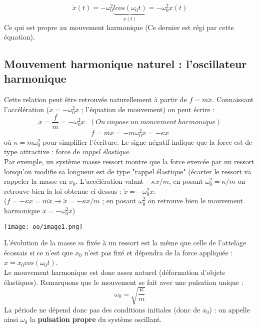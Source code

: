 \documentclass[british,french,11pt, a4paper, openany]{book}
\begin{document}
	
	
	\begin{equation}
		\ddot{x}(t) = -\omega_0^2 \underbrace{l cos(\omega_0 t)}_{x(t)} = - \omega_0^2 x(t)
	\end{equation}
	Ce qui est propre au mouvement harmonique (Ce dernier est régi par cette équation).
	
	\subsection{Mouvement harmonique naturel : l'oscillateur harmonique}
	Cette relation peut être retrouvée naturellement à partir de $f = m\ddot{x}$. Connaissant l'accélération ($\ddot{x} = -\omega_0^2 x$ ; l'équation de mouvement) on peut écrire :
	\begin{equation}
		\ddot{x} = \frac{f}{m} = -\omega_0^2 x\ \ \ (On\ impose\ un\ mouvement\ harmonique)
	\end{equation}
	\begin{equation}
		f = m \ddot{x} = -m\omega_0^2 x = -\kappa x
	\end{equation}
	où $\kappa = m\omega_0^2$ pour simplifier l'écriture. Le signe négatif indique que la force est de type attractive : force de \textit{rappel élastique}.\\
	
	Par exemple, un système masse ressort montre que la force exercée par un ressort lorsqu'on modifie sa longueur est de type "rappel élastique" (écarter le ressort va rappeler la masse en $x_0$. L'accélération valant $-\kappa x/m$, en posant $\omega_0^2 = \kappa /m$ on retrouve bien la loi obtenue ci-dessus : $\ddot{x} = -\omega_0^2x$.\\
	($f = -\kappa x = m\ddot{x} \rightarrow \ddot{x} = -\kappa x/m$ ; en posant $\omega_0^2$ on retrouve bien le mouvement harmonique $\ddot{x} = -\omega_0^2x$)
	
	\begin{center}
		\texttt{[image: oo/image1.png]}
	\end{center}
	
	L'évolution de la masse $m$ fixée à un ressort est la même que celle de l'attelage écossais si ce n'est que $x_0$ n'est pas fixé et dépendra de la force appliquée : $x = x_0 cos(\omega_0 t)$.\\
	
	Le mouvement harmonique est donc assez naturel (déformation d'objets élastiques). Remarquons que le mouvement se fait avec une pulsation unique :
	\begin{equation}
		\omega_0 = \sqrt{\frac{\kappa}{m}}
	\end{equation}
	La période ne dépend donc pas des conditions initiales (donc de $x_0$) : on appelle ainsi $\omega_0$ la \textbf{pulsation propre} du système oscillant.
	
\end{document}
